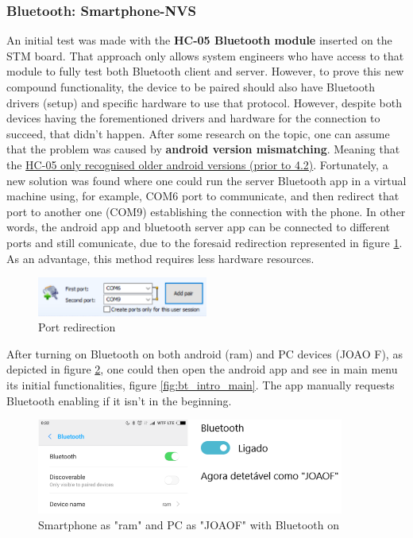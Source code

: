 \subsubsection{Bluetooth: Smartphone-NVS}%
\label{sec:bluetooth-phone-nvs}
%
An initial test was made with the \textbf{HC-05 Bluetooth module} inserted on the STM board. That approach only allows system engineers who have access to that module to fully test both Bluetooth client and server. 
%
However, to prove this new compound functionality, the device to be paired should also have Bluetooth drivers (setup) and specific hardware to use that protocol.
%
However, despite both devices having the forementioned drivers and hardware for the connection to succeed, that didn't happen. After some research on the topic, one can assume that the problem was caused by \textbf{android version mismatching}. Meaning that the \underline{HC-05 only recognised older android versions (prior to 4.2)}.
%
Fortunately, a new solution was found where one could run the server Bluetooth app in a virtual machine using, for example, COM6 port to communicate, and then redirect that port to another one (COM9) establishing the connection with the phone. In other words, the android app and bluetooth server app can be connected to different ports and still comunicate, due to the foresaid redirection represented in figure \ref{fig:port-red}. As an advantage, this method requires less hardware resources.
%
\begin{figure}[!ht]
\centering
\includegraphics[width=0.5\textwidth]{img/port-red.png}
\caption{\label{fig:port-red}Port redirection}
\end{figure}
%
After turning on Bluetooth on both android (ram) and PC devices (JOAO F), as depicted in figure \ref{fig:bt_app_pc}, one could then open the android app and see in main menu its initial functionalities, figure \ref{fig:bt_intro_main}. The app manually requests Bluetooth enabling if it isn't in the beginning.
%
\begin{figure}[!ht]
\centering
\includegraphics[width=0.9\textwidth]{img/bt_app_pc.png}
\caption{\label{fig:bt_app_pc}Smartphone as "ram" and PC as "JOAOF" with Bluetooth on}
\end{figure}
